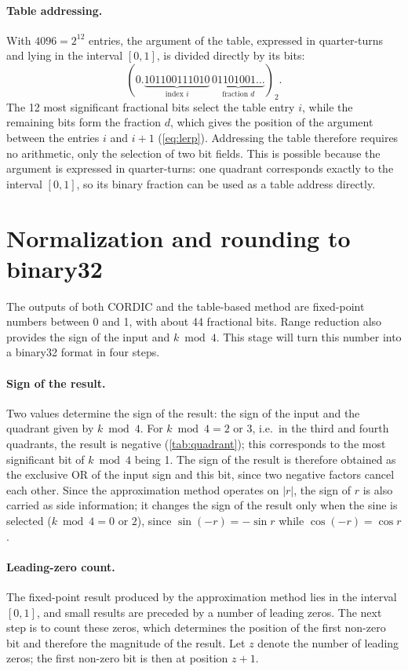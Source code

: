 \paragraph{Table addressing.}
With $4096 = 2^{12}$ entries, the argument of the table, expressed in
quarter-turns and lying in the interval $[0, 1]$, is divided directly by its
bits:
\begin{equation*}
  (0.\underbrace{101100111010}_{\text{index } i}\,
  \underbrace{01101001\ldots}_{\text{fraction } d})_{2}.
\end{equation*}
The 12 most significant fractional bits select the table entry $i$, while
the remaining bits form the fraction $d$, which gives the position of the
argument between the entries $i$ and $i+1$ (\cref{eq:lerp}). Addressing the
table therefore requires no arithmetic, only the selection of two bit fields.
This is possible because the argument is expressed in quarter-turns: one
quadrant corresponds exactly to the interval $[0, 1]$, so its binary
fraction can be used as a table address directly.

\section{Normalization and rounding to binary32}
\label{sec:normalization}

The outputs of both CORDIC and the table-based method are fixed-point numbers
between 0 and 1, with about 44 fractional bits. Range reduction also provides
the sign of the input and $k \bmod 4$.
This stage will turn this number into a binary32 format in four steps.

\paragraph{Sign of the result.}
Two values determine the sign of the result: the sign of the input and the
quadrant given by $k \bmod 4$. For $k \bmod 4 = 2$ or $3$, i.e.\ in the third
and fourth quadrants, the result is negative (\cref{tab:quadrant}); this
corresponds to the most significant bit of $k \bmod 4$ being 1. The sign of
the result is therefore obtained as the exclusive OR of the input sign and
this bit, since two negative factors cancel each other.
Since the approximation method operates on $|r|$, the sign of $r$ is also
carried as side information; it changes the sign of the result only when the
sine is selected ($k \bmod 4 = 0$ or $2$), since $\sin(-r) = -\sin r$ while
$\cos(-r) = \cos r$.

\paragraph{Leading-zero count.}
The fixed-point result produced by the approximation method lies in the
interval $[0, 1]$, and small results are preceded by a number of leading
zeros. The next step is to count these zeros, which determines the position
of the first non-zero bit and therefore the magnitude of the result.
Let $z$ denote the number of leading zeros; the first non-zero bit is then
at position $z + 1$.

